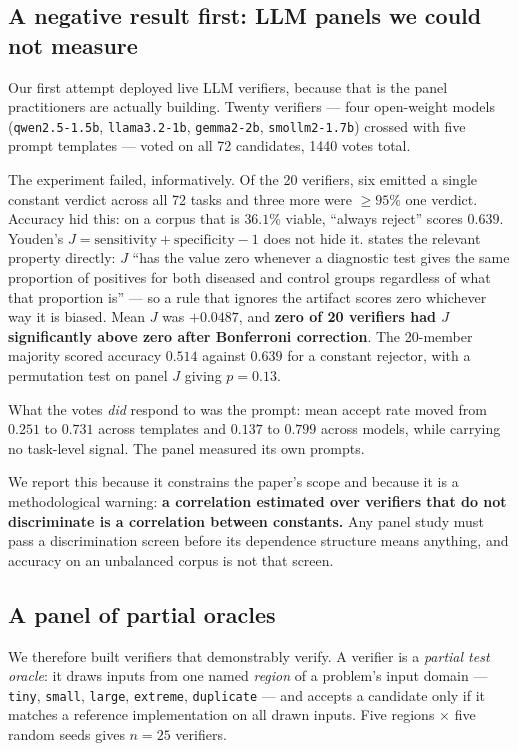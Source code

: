 \documentclass[11pt,a4paper]{article}
\newcommand{\code}[1]{\texttt{#1}}
\begin{document}
\subsection{A negative result first: LLM panels we could not measure}
\label{sec:e016}

Our first attempt deployed live LLM verifiers, because that is the panel
practitioners are actually building. Twenty verifiers --- four open-weight models
(\code{qwen2.5-1.5b}, \code{llama3.2-1b}, \code{gemma2-2b}, \code{smollm2-1.7b})
crossed with five prompt templates --- voted on all 72 candidates, 1440 votes
total.

The experiment failed, informatively. Of the 20 verifiers, six emitted a single
constant verdict across all 72 tasks and three more were $\geq 95\%$ one verdict.
Accuracy hid this: on a corpus that is $36.1\%$ viable, ``always reject'' scores
$0.639$. Youden's $J = \text{sensitivity} + \text{specificity} - 1$
\citep{youden1950} does not hide it. \citet{youden1950} states the relevant
property directly: $J$ ``has the value zero whenever a diagnostic test gives the
same proportion of positives for both diseased and control groups regardless of
what that proportion is'' --- so a rule that ignores the artifact scores zero
whichever way it is biased. Mean $J$ was $+0.0487$, and \textbf{zero of 20
verifiers had $J$ significantly above zero after Bonferroni correction}. The
20-member majority scored accuracy $0.514$ against $0.639$ for a constant
rejector, with a permutation test on panel $J$ giving $p = 0.13$.

What the votes \emph{did} respond to was the prompt: mean accept rate moved from
$0.251$ to $0.731$ across templates and $0.137$ to $0.799$ across models, while
carrying no task-level signal. The panel measured its own prompts.

We report this because it constrains the paper's scope and because it is a
methodological warning: \textbf{a correlation estimated over verifiers that do not
discriminate is a correlation between constants.} Any panel study must pass a
discrimination screen before its dependence structure means anything, and
accuracy on an unbalanced corpus is not that screen.

\subsection{A panel of partial oracles}

We therefore built verifiers that demonstrably verify. A verifier is a
\emph{partial test oracle}: it draws inputs from one named \emph{region} of a
problem's input domain --- \code{tiny}, \code{small}, \code{large},
\code{extreme}, \code{duplicate} --- and accepts a candidate only if it matches a
reference implementation on all drawn inputs. Five regions $\times$ five random
seeds gives $n = 25$ verifiers.
\end{document}
